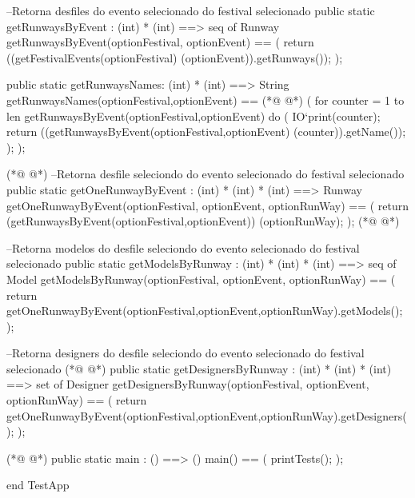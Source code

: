 \begin{vdmpp}[breaklines=true]
 --Retorna desfiles do evento selecionado do festival selecionado
  public static getRunwaysByEvent : (int) * (int) ==> seq of Runway
 getRunwaysByEvent(optionFestival, optionEvent) ==
 (
  return ((getFestivalEvents(optionFestival) (optionEvent)).getRunways());
 );
 
 public static getRunwaysNames: (int) * (int) ==> String
  getRunwaysNames(optionFestival,optionEvent) ==
(*@
\label{getEvent:88}
@*)
  ( 
    for counter = 1 to len getRunwaysByEvent(optionFestival,optionEvent) do (
    IO`print(counter);
    return ((getRunwaysByEvent(optionFestival,optionEvent) (counter)).getName());
    );
  );
  
(*@
\label{getRunwaysByEvent:95}
@*)
 --Retorna desfile seleciondo do evento selecionado do festival selecionado
  public static getOneRunwayByEvent : (int) * (int) * (int) ==> Runway
 getOneRunwayByEvent(optionFestival, optionEvent, optionRunWay) ==
 (
  return (getRunwaysByEvent(optionFestival,optionEvent)) (optionRunWay);
 );
(*@
\label{getRunwaysNames:101}
@*)
 
 --Retorna modelos do desfile seleciondo do evento selecionado do festival selecionado
 public static getModelsByRunway : (int) * (int) * (int) ==> seq of Model
 getModelsByRunway(optionFestival, optionEvent, optionRunWay) ==
 (
 return getOneRunwayByEvent(optionFestival,optionEvent,optionRunWay).getModels();
 );
    
   
  --Retorna designers do desfile seleciondo do evento selecionado do festival selecionado  
(*@
\label{getOneRunwayByEvent:111}
@*)
  public static getDesignersByRunway : (int) * (int) * (int) ==> set of Designer
 getDesignersByRunway(optionFestival, optionEvent, optionRunWay) ==
 (
 return getOneRunwayByEvent(optionFestival,optionEvent,optionRunWay).getDesigners();
 );
  

(*@
\label{getModelsByRunway:118}
@*)
public static main : () ==> ()
  main() ==
  (
   printTests();
  );

end TestApp
\end{vdmpp}
\bigskip
